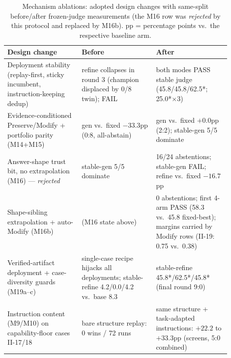 \begin{table}[t]
\centering
\caption{Mechanism ablations: adopted design changes with same-split
before/after frozen-judge measurements (the M16 row was \emph{rejected}
by this protocol and replaced by M16b). pp = percentage points vs.\ the
respective baseline arm.}
\label{tab:ablation}
\small
\begin{tabular}{p{0.30\linewidth}p{0.30\linewidth}p{0.30\linewidth}}
\toprule
Design change & Before & After\\
\midrule
Deployment stability (replay-first, sticky incumbent, instruction-keeping dedup) &
refine collapses in round 3 (champion displaced by 0/8 twin); FAIL &
both modes PASS stable judge (45.8/45.8/62.5*; 25.0*$\times$3)\\
\addlinespace
Evidence-conditioned Preserve/Modify + portfolio parity (M14+M15) &
gen vs.\ fixed $-33.3$pp (0:8, all-abstain) &
gen vs.\ fixed $+0.0$pp (2:2); stable-gen 5/5 dominate\\
\addlinespace
Answer-shape trust bit, no extrapolation (M16) — \emph{rejected} &
stable-gen 5/5 dominate &
16/24 abstentions; stable-gen FAIL; refine vs.\ fixed $-16.7$pp\\
\addlinespace
Shape-sibling extrapolation + auto-Modify (M16b) &
(M16 state above) &
0 abstentions; first 4-arm PASS (58.3 vs.\ 45.8 fixed-best); margins carried by Modify rows (II-19: 0.75 vs.\ 0.38)\\
\addlinespace
Verified-artifact deployment + case-diversity guards (M19a--c) &
single-case recipe hijacks all deployments; stable-refine 4.2/0.0/4.2 vs.\ base 8.3 &
stable-refine 45.8*/62.5*/45.8* (final round 9:0)\\
\addlinespace
Instruction content (M9/M10) on capability-floor cases II-17/18 &
bare structure replay: 0 wins / 72 runs &
same structure + task-adapted instructions: $+22.2$ to $+33.3$pp (screens, 5:0 combined)\\
\bottomrule
\end{tabular}
\end{table}
